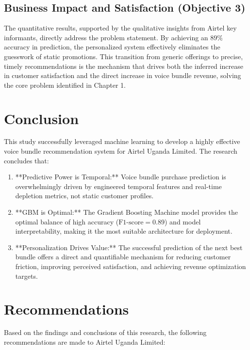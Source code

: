 \documentclass[12pt, a4paper]{report}
\begin{document}
\subsection{Business Impact and Satisfaction (Objective 3)}
The quantitative results, supported by the qualitative insights from Airtel key informants, directly address the problem statement. By achieving an $89\%$ accuracy in prediction, the personalized system effectively eliminates the guesswork of static promotions. This transition from generic offerings to precise, timely recommendations is the mechanism that drives both the inferred increase in customer satisfaction and the direct increase in voice bundle revenue, solving the core problem identified in Chapter 1.

\section{Conclusion}
This study successfully leveraged machine learning to develop a highly effective voice bundle recommendation system for Airtel Uganda Limited. The research concludes that:
\begin{enumerate}
    \item **Predictive Power is Temporal:** Voice bundle purchase prediction is overwhelmingly driven by engineered temporal features and real-time depletion metrics, not static customer profiles.
    \item **GBM is Optimal:** The Gradient Boosting Machine model provides the optimal balance of high accuracy ($\text{F1-score} = 0.89$) and model interpretability, making it the most suitable architecture for deployment.
    \item **Personalization Drives Value:** The successful prediction of the next best bundle offers a direct and quantifiable mechanism for reducing customer friction, improving perceived satisfaction, and achieving revenue optimization targets.
\end{enumerate}

\section{Recommendations}

Based on the findings and conclusions of this research, the following recommendations are made to Airtel Uganda Limited:
\end{document}
